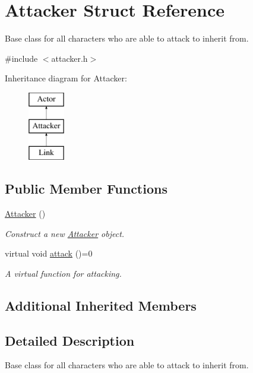 \hypertarget{structAttacker}{}\section{Attacker Struct Reference}
\label{structAttacker}


Base class for all characters who are able to attack to inherit from.  




{\ttfamily \#include $<$attacker.\+h$>$}

Inheritance diagram for Attacker\+:\begin{figure}[H]
\begin{center}
\leavevmode
\includegraphics[height=3.000000cm]{structAttacker}
\end{center}
\end{figure}
\subsection*{Public Member Functions}
\begin{DoxyCompactItemize}
\item 
\mbox{\hyperlink{structAttacker_a84fe68147e28f2e98d8eeecee9d3734c}{Attacker}} ()
\begin{DoxyCompactList}\small\item\em Construct a new \mbox{\hyperlink{structAttacker}{Attacker}} object. \end{DoxyCompactList}\item 
virtual void \mbox{\hyperlink{structAttacker_a4ce0aa08a102bd688d9a47322a830173}{attack}} ()=0
\begin{DoxyCompactList}\small\item\em A virtual function for attacking. \end{DoxyCompactList}\end{DoxyCompactItemize}
\subsection*{Additional Inherited Members}


\subsection{Detailed Description}
Base class for all characters who are able to attack to inherit from. 




